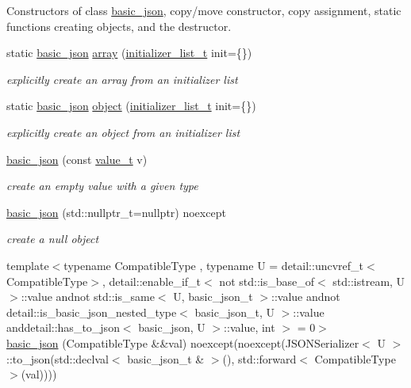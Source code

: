 Constructors of class \hyperlink{classnlohmann_1_1basic__json}{basic\+\_\+json}, copy/move constructor, copy assignment, static functions creating objects, and the destructor. \begin{DoxyCompactItemize}
\item 
static \hyperlink{classnlohmann_1_1basic__json}{basic\+\_\+json} \hyperlink{classnlohmann_1_1basic__json_aa80485befaffcadaa39965494e0b4d2e}{array} (\hyperlink{classnlohmann_1_1basic__json_a670f6a0eb3d1e0ffd00c27d35472ccc9}{initializer\+\_\+list\+\_\+t} init=\{\})
\begin{DoxyCompactList}\small\item\em explicitly create an array from an initializer list \end{DoxyCompactList}\item 
static \hyperlink{classnlohmann_1_1basic__json}{basic\+\_\+json} \hyperlink{classnlohmann_1_1basic__json_aa13f7c0615867542ce80337cbcf13ada}{object} (\hyperlink{classnlohmann_1_1basic__json_a670f6a0eb3d1e0ffd00c27d35472ccc9}{initializer\+\_\+list\+\_\+t} init=\{\})
\begin{DoxyCompactList}\small\item\em explicitly create an object from an initializer list \end{DoxyCompactList}\item 
\hyperlink{classnlohmann_1_1basic__json_aed115142bd0c6c66c864700e0467df55}{basic\+\_\+json} (const \hyperlink{namespacenlohmann_1_1detail_a90aa5ef615aa8305e9ea20d8a947980f}{value\+\_\+t} v)
\begin{DoxyCompactList}\small\item\em create an empty value with a given type \end{DoxyCompactList}\item 
\hyperlink{classnlohmann_1_1basic__json_ae9be9e956bfc4658f35d17c6aa72b063}{basic\+\_\+json} (std\+::nullptr\+\_\+t=nullptr) noexcept
\begin{DoxyCompactList}\small\item\em create a null object \end{DoxyCompactList}\item 
{\footnotesize template$<$typename Compatible\+Type , typename U  = detail\+::uncvref\+\_\+t$<$\+Compatible\+Type$>$, detail\+::enable\+\_\+if\+\_\+t$<$ not std\+::is\+\_\+base\+\_\+of$<$ std\+::istream, U $>$\+::value andnot std\+::is\+\_\+same$<$ U, basic\+\_\+json\+\_\+t $>$\+::value andnot detail\+::is\+\_\+basic\+\_\+json\+\_\+nested\+\_\+type$<$ basic\+\_\+json\+\_\+t, U $>$\+::value anddetail\+::has\+\_\+to\+\_\+json$<$ basic\+\_\+json, U $>$\+::value, int $>$  = 0$>$ }\\\hyperlink{classnlohmann_1_1basic__json_a7639e0834df2bc719a04ffea89b31abc}{basic\+\_\+json} (Compatible\+Type \&\&val) noexcept(noexcept(J\+S\+O\+N\+Serializer$<$ U $>$\+::to\+\_\+json(std\+::declval$<$ basic\+\_\+json\+\_\+t \& $>$(), std\+::forward$<$ Compatible\+Type $>$(val))))

\end{DoxyCompactItemize}
